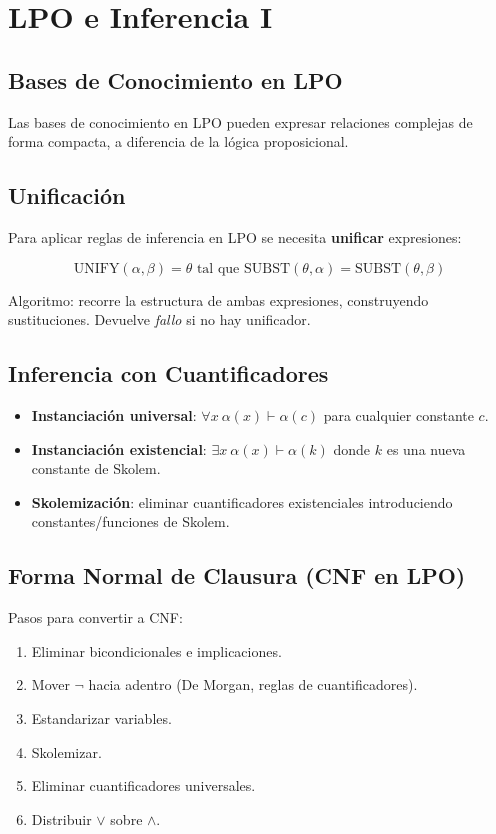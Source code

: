 \section{LPO e Inferencia I}

\subsection{Bases de Conocimiento en LPO}

Las bases de conocimiento en LPO pueden expresar relaciones complejas de forma compacta, a diferencia de la lógica proposicional.

\subsection{Unificación}

Para aplicar reglas de inferencia en LPO se necesita \textbf{unificar} expresiones:

$$\text{UNIFY}(\alpha, \beta) = \theta \text{ tal que } \text{SUBST}(\theta, \alpha) = \text{SUBST}(\theta, \beta)$$

Algoritmo: recorre la estructura de ambas expresiones, construyendo sustituciones. Devuelve \textit{fallo} si no hay unificador.

\subsection{Inferencia con Cuantificadores}

\begin{itemize}
    \item \textbf{Instanciación universal}: $\forall x\ \alpha(x) \vdash \alpha(c)$ para cualquier constante $c$.
    \item \textbf{Instanciación existencial}: $\exists x\ \alpha(x) \vdash \alpha(k)$ donde $k$ es una nueva constante de Skolem.
    \item \textbf{Skolemización}: eliminar cuantificadores existenciales introduciendo constantes/funciones de Skolem.
\end{itemize}

\subsection{Forma Normal de Clausura (CNF en LPO)}

Pasos para convertir a CNF:
\begin{enumerate}
    \item Eliminar bicondicionales e implicaciones.
    \item Mover $\neg$ hacia adentro (De Morgan, reglas de cuantificadores).
    \item Estandarizar variables.
    \item Skolemizar.
    \item Eliminar cuantificadores universales.
    \item Distribuir $\lor$ sobre $\land$.
\end{enumerate}

